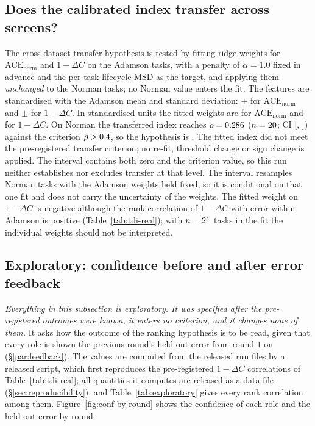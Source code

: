\subsection{Does the calibrated index transfer across screens?}\label{subsec:h5}

The cross-dataset transfer hypothesis is tested by fitting ridge weights for
$\mathrm{ACE}_{\mathrm{norm}}$ and $1-\Delta C$ on the Adamson tasks, with a penalty of
$\alpha=1.0$ fixed in advance and the per-task lifecycle MSD as the target, and applying them
\emph{unchanged} to the Norman tasks; no Norman value enters the fit. The features are
standardised with the Adamson mean and standard deviation: \resHFiveStdMeanAce{} $\pm$
\resHFiveStdSdAce{} for $\mathrm{ACE}_{\mathrm{norm}}$ and \resHFiveStdMeanDc{} $\pm$
\resHFiveStdSdDc{} for $1-\Delta C$. In standardised units the fitted weights are \resHFiveWAce{}
for $\mathrm{ACE}_{\mathrm{norm}}$ and \resHFiveWDc{} for $1-\Delta C$. On Norman the transferred
index reaches $\rho=0.286$ ($n=20$; CI [\resHFiveCILo, \resHFiveCIHi]) against the
criterion $\rho>0.4$, so the hypothesis is \resHFiveVerdict. The
fitted index did not meet the pre-registered transfer criterion; no re-fit, threshold change or
sign change is applied. The interval contains both zero and the criterion value, so this run
neither establishes nor excludes transfer at that level. The interval resamples Norman tasks
with the Adamson weights held fixed, so it is conditional on that one fit and does not carry
the uncertainty of the weights. The fitted weight on $1-\Delta C$ is negative although the
rank correlation of $1-\Delta C$ with error within Adamson is positive
(Table~\ref{tab:tdi-real}); with $n=21$ tasks in the fit the individual weights
should not be interpreted.

\subsection{Exploratory: confidence before and after error feedback}\label{subsec:exploratory}

\emph{Everything in this subsection is exploratory. It was specified after the pre-registered outcomes
were known, it enters no criterion, and it changes none of them.} It asks how the outcome of the
ranking hypothesis is to be read, given that every role is shown the previous round's held-out
error from round $1$ on (\S\ref{par:feedback}). The values are computed from the released run
files by a released script, which first reproduces the pre-registered
$1-\Delta C$ correlations of Table~\ref{tab:tdi-real}; all \explNQuantities{} quantities it computes
are released as a data file (\S\ref{sec:reproducibility}), and Table~\ref{tab:exploratory} gives every
rank correlation among them. Figure~\ref{fig:conf-by-round} shows the confidence of each role and
the held-out error by round.


